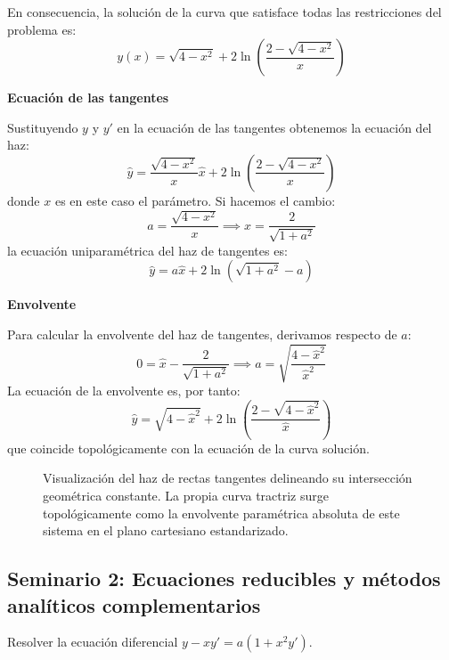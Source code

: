 \begin{tcolorbox}
En consecuencia, la solución de la curva que satisface todas las restricciones del problema es:
$$ y(x) = \sqrt{4 - x^2} + 2\ln\left( \frac{2 - \sqrt{4 - x^2}}{x} \right) $$

\textbf{Ecuación de las tangentes}

Sustituyendo $y$ y $y'$ en la ecuación de las tangentes obtenemos la ecuación del haz:
$$ \hat{y} = \frac{\sqrt{4-x^2}}{x}\hat{x} + 2\ln\left( \frac{2 - \sqrt{4-x^2}}{x} \right) $$
donde $x$ es en este caso el parámetro. Si hacemos el cambio:
$$ a = \frac{\sqrt{4-x^2}}{x} \implies x = \frac{2}{\sqrt{1+a^2}} $$
la ecuación uniparamétrica del haz de tangentes es:
$$ \hat{y} = a\hat{x} + 2\ln(\sqrt{1+a^2}-a) $$

\textbf{Envolvente}

Para calcular la envolvente del haz de tangentes, derivamos respecto de $a$:
$$ 0 = \hat{x} - \frac{2}{\sqrt{1+a^2}} \implies a = \sqrt{\frac{4-\hat{x}^2}{\hat{x}^2}} $$
La ecuación de la envolvente es, por tanto:
$$ \hat{y} = \sqrt{4-\hat{x}^2} + 2\ln\left( \frac{2 - \sqrt{4-\hat{x}^2}}{\hat{x}} \right) $$
que coincide topológicamente con la ecuación de la curva solución.

\begin{figure}[H]
    \centering
    
    \caption{Visualización del haz de rectas tangentes delineando su intersección geométrica constante. La propia curva tractriz surge topológicamente como la envolvente paramétrica absoluta de este sistema en el plano cartesiano estandarizado.}
\end{figure}
\end{tcolorbox}

\subsection{Seminario 2: Ecuaciones reducibles y métodos analíticos complementarios}

\begin{ejercicio}
Resolver la ecuación diferencial $y - xy' = a(1 + x^2y')$.
\end{ejercicio}

